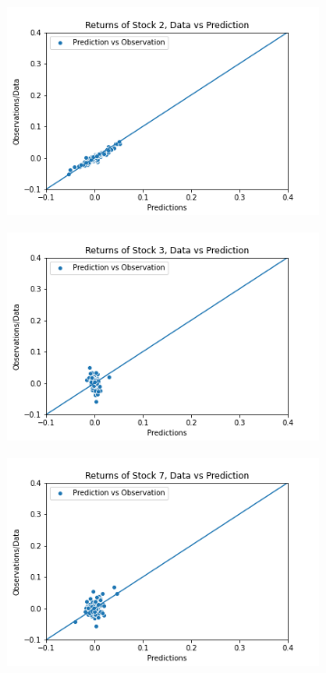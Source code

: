 \begin{figure}%
	\centering
	\begin{subfigure}[l]{0.2\textwidth}
		\includegraphics[width=\textwidth]{img/07_0/N60D123/Q1_kernel1_stock2_scatter.png}
	\end{subfigure}
	\begin{subfigure}[c]{0.3\textwidth}
		\includegraphics[width=\textwidth]{img/07_0/N60D123/Q1_kernel1_stock3_scatter.png}
	\end{subfigure}
	\begin{subfigure}[r]{0.3\textwidth}
		\includegraphics[width=\textwidth]{img/07_0/N60D123/Q1_kernel1_stock7_scatter.png}

\end{subfigure}
\end{figure}
